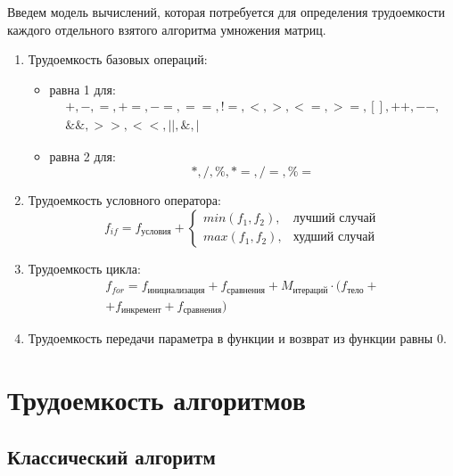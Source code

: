 Введем модель вычислений, которая потребуется для определения трудоемкости каждого отдельного взятого алгоритма умножения матриц.
\begin{enumerate}[label={\arabic*)}]
	\item Трудоемкость базовых операций:
	\begin{itemize}[label=---]
		\item равна 1 для:
		\begin{equation}
			\label{for:operations_1}
			\begin{gathered}
				+, -, =, +=, -=, ==, !=, <, >, <=, >=, [], ++, {-}-,\\
				\&\&, >>, <<, ||, \&, |
			\end{gathered}
		\end{equation}
		\item равна 2 для:
		\begin{equation}
			\label{for:operations_2}
			*, /, \%, *=, /=, \%=
		\end{equation}
	\end{itemize}
	\item Трудоемкость условного оператора:
	\begin{equation}
		\label{for:if}
		f_{if} = f_{\text{условия}} + 
		\begin{cases}
			min(f_1, f_2), & \text{лучший случай}\\
			max(f_1, f_2), & \text{худший случай}
		\end{cases}
	\end{equation}
	\clearpage
	\item Трудоемкость цикла:
	\begin{equation}
		\label{for:for}
		\begin{gathered}
			f_{for} = f_{\text{инициализация}} + f_{\text{сравнения}} + M_{\text{итераций}} \cdot (f_{\text{тело}} +\\
			+ f_{\text{инкремент}} + f_{\text{сравнения}})
		\end{gathered}
	\end{equation}
	\item Трудоемкость передачи параметра в функции и возврат из функции равны 0.
\end{enumerate}


\section{Трудоемкость алгоритмов}

\subsection{Классический алгоритм}

